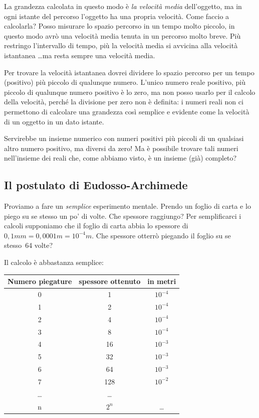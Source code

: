 La grandezza calcolata in questo modo è \emph{la velocità media} 
dell'oggetto, 
ma in ogni istante del percorso l'oggetto ha una propria velocità. Come 
faccio 
a calcolarla? Posso misurare lo spazio percorso in un tempo molto piccolo, in 
questo modo avrò una velocità media tenuta in un percorso molto breve. Più 
restringo l'intervallo di tempo, più la velocità media si avvicina alla 
velocità istantanea \dots ma resta sempre una velocità media. 

Per trovare la velocità istantanea dovrei dividere lo spazio percorso per un 
tempo (positivo) più piccolo di qualunque numero. L'unico numero reale
positivo, più piccolo di qualunque numero positivo è lo zero, ma 
non posso usarlo per il calcolo della velocità, perché la divisione per 
zero non è definita: i numeri reali non ci permettono di calcolare una 
grandezza così semplice e evidente come la velocità di un oggetto in un dato 
istante.

Servirebbe un insieme numerico con numeri positivi più piccoli di un 
qualsiasi altro numero positivo, ma diversi da zero! Ma è possibile 
trovare tali numeri nell'insieme dei reali che, come abbiamo visto, 
è un insieme (già) completo?

\subsection{Il postulato di Eudosso-Archimede}
\label{subsec:insnum_eudossoarchimede}

Proviamo a fare un \emph{semplice} esperimento mentale. Prendo un foglio di 
carta e lo piego su se stesso un po' di volte. Che spessore raggiungo?
Per semplificarci i calcoli supponiamo che il foglio di carta abbia lo 
spessore 
di $0,1mm = 0,0001m = 10^{-4}m$. 
Che spessore otterrò piegando il foglio su se stesso~64 volte?

Il calcolo è abbastanza semplice:

\begin{center}
 \begin{tabular}{ccc}
\toprule
Numero piegature & spessore ottenuto & in metri\\
\midrule
0 & 1 & $10^{-4}$\\
1 & 2 & $10^{-4}$\\
2 & 4 & $10^{-4}$\\
3 & 8 & $10^{-4}$\\
4 & 16 & $10^{-3}$\\
5 & 32 & $10^{-3}$\\
6 & 64 & $10^{-3}$\\
7 & 128 & $10^{-2}$\\
\ldots& \ldots\\
n & $2^n$ & \ldots\\
\bottomrule
\end{tabular}
\end{center}

